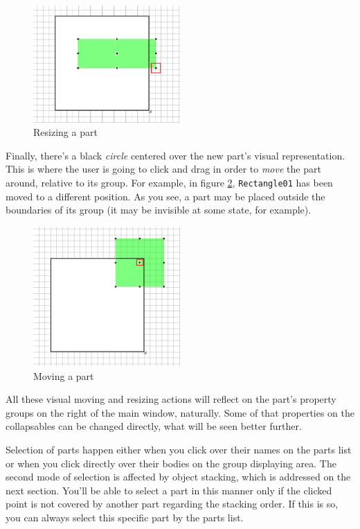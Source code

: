 \documentclass[a4paper]{profusion}
\begin{document}
\begin{figure}[h!]
  \centering
  \includegraphics[width=0.5\textwidth]{images/rectangle_grow_diagonal.png}
  \caption{Resizing a part}
  \label{fig:rectangle_grow_diagonal}
\end{figure}

Finally, there's a black \emph{circle} centered over the new part's
visual representation. This is where the user is going to click and
drag in order to \emph{move} the part around, relative to its
group. For example, in figure \ref{fig:rectangle_move},
\texttt{Rectangle01} has been moved to a different position. As you
see, a part may be placed outside the boundaries of its group (it may
be invisible at some state, for example).

\begin{figure}[h!]
  \centering
  \includegraphics[width=0.5\textwidth]{images/rectangle_move.png}
  \caption{Moving a part}
  \label{fig:rectangle_move}
\end{figure}

All these visual moving and resizing actions will reflect on the
part's property groups on the right of the main window,
naturally. Some of that properties on the collapsables can be changed
directly, what will be seen better further.

Selection of parts happen either when you click over their names on
the parts list or when you click directly over their bodies on the
group displaying area. The second mode of selection is affected by
object stacking, which is addressed on the next section. You'll be
able to select a part in this manner only if the clicked point is not
covered by another part regarding the stacking order. If this is so,
you can always select this specific part by the parts list.
\end{document}
